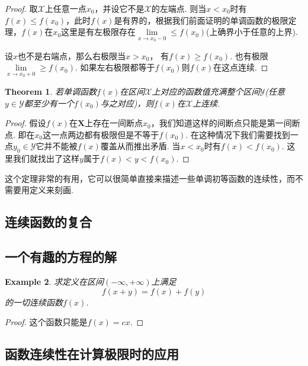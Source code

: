 \documentclass{article}
\newtheorem{theorem}{Theorem}[section]
\newtheorem{example}[theorem]{Example}
\begin{document}
\begin{proof}
取$\mathcal{X}$上任意一点$x_0$，并设它不是$\mathcal{X}$的左端点. 则当$x < x_0$时有$f(x) \leq f(x_0)$，此时$f(x)$是有界的，根据我们前面证明的单调函数的极限定理，$f(x)$在$x_0$这里是有左极限存在$\lim\limits_{x \rightarrow x_0-0} \leq f(x_0)$(上确界小于任意的上界).

设$x$也不是右端点，那么右极限当$x > x_0$， 有$f(x) \geq f(x_0)$. 也有极限$\lim\limits_{x \rightarrow x_0 + 0} \geq f(x_0)$. 如果左右极限都等于$f(x_0)$则$f(x)$在这点连续.
\end{proof}


\begin{theorem}
\rm 若单调函数$f(x)$在区间$\mathcal{X}$上对应的函数值充满整个区间$\mathcal{Y}$(任意$y \in \mathcal{Y}$都至少有一个$f(x_0)$与之对应)，则$f(x)$在$\mathcal{X}$上连续.
\end{theorem}

\begin{proof}
假设$f(x)$在$\mathbf{X}$上存在一间断点$x_0$，我们知道这样的间断点只能是第一间断点. 即在$x_0$这一点两边都有极限但是不等于$f(x_0)$. 在这种情况下我们需要找到一点$y_0 \in \mathcal{Y}$它并不能被$f(x)$覆盖从而推出矛盾. 当$x < x_0$时有$f(x)< f(x_0)$. 这里我们就找出了这样$y$属于$f(x) < y < f(x_0)$.
\end{proof}

这个定理非常的有用，它可以很简单直接来描述一些单调初等函数的连续性，而不需要用定义来刻画.

\newpage
\subsection{连续函数的复合}

\newpage
\subsection{一个有趣的方程的解}

\begin{example}
求定义在区间$(-\infty,+\infty)$上满足
$$
f(x+y) = f(x) + f(y)
$$
的一切连续函数$f(x)$.
\end{example}

\begin{proof}
这个函数只能是$f(x)=cx$.
\end{proof}

\newpage
\subsection{函数连续性在计算极限时的应用}
\end{document}
